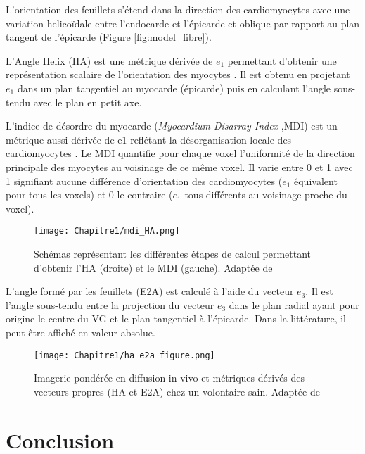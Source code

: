 L’orientation des feuillets s’étend dans la direction des cardiomyocytes avec une variation helicoïdale entre l’endocarde et l’épicarde et oblique par rapport au plan tangent de l’épicarde (Figure \ref{fig:model_fibre}).

L’Angle Helix (HA) est une métrique dérivée de $e_1$ permettant d’obtenir une représentation scalaire de l’orientation des myocytes \cite{Ferreira2013}. Il est obtenu en projetant $e_1$ dans un plan tangentiel au myocarde (épicarde) puis en calculant l’angle sous-tendu avec le plan en petit axe.

L’indice de désordre du myocarde (\textit{Myocardium Disarray Index} ,MDI) est un métrique aussi dérivée de e1 reflétant la désorganisation locale des cardiomyocytes \cite{Wu2004} \cite{GarciaCanadilla2019}. Le MDI quantifie pour chaque voxel l’uniformité de la direction principale des myocytes au voisinage de ce même voxel. Il varie entre 0 et 1 avec 1 signifiant aucune différence d’orientation des cardiomyocytes ($e_1$ équivalent pour tous les voxels) et 0 le contraire ($e_1$ tous différents au voisinage proche du voxel).
\begin{figure}[!h]
\begin{center}
  \texttt{[image: Chapitre1/mdi\_HA.png]}
   \end{center}
  \caption{Schémas représentant les différentes étapes de calcul permettant d’obtenir l’HA (droite) et le MDI (gauche). Adaptée de \cite{Ferreira2013}}
\label{fig:dti_HA_mdi}
\end{figure}

L’angle formé par les feuillets (E2A) est calculé à l’aide du vecteur $e_3$. Il est l’angle sous-tendu entre la projection du vecteur $e_3$ dans le plan radial ayant pour origine le centre du VG et le plan tangentiel à l’épicarde\cite{Dou2002}. Dans la littérature, il peut être affiché en valeur absolue.

\begin{figure}[!h]
\begin{center}
  \texttt{[image: Chapitre1/ha\_e2a\_figure.png]}
   \end{center}
  \caption{Imagerie pondérée en diffusion in vivo et métriques dérivés des vecteurs propres (HA et E2A) chez un volontaire sain. Adaptée de \cite{Ferreira2014}}
\label{fig:dti_e2A}
\end{figure}


\section{Conclusion}


